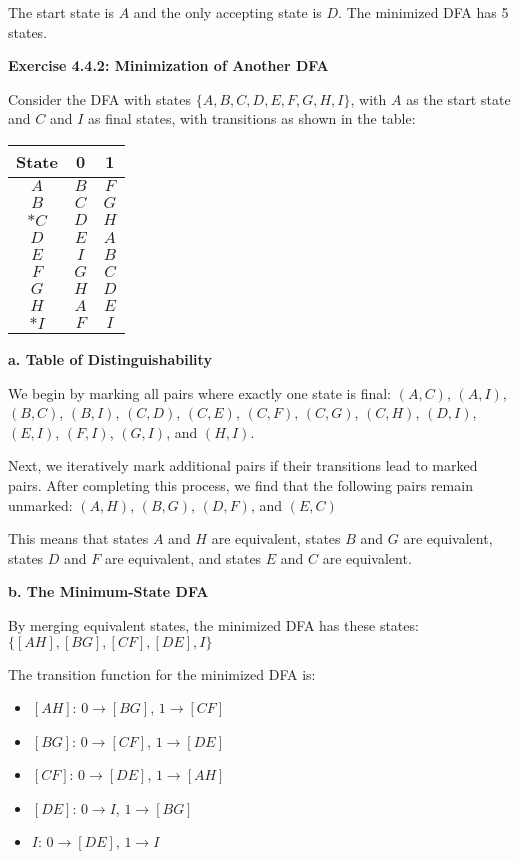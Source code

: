 \documentclass{article}
\theoremstyle{theorem}
\theoremstyle{definition}
\theoremstyle{remark}
\begin{document}
The start state is $A$ and the only accepting state is $D$. The minimized DFA has 5 states.

\textbf{Exercise 4.4.2: Minimization of Another DFA}

Consider the DFA with states $\{A, B, C, D, E, F, G, H, I\}$, with $A$ as the start state and $C$ and $I$ as final states, with transitions as shown in the table:

\begin{center}
\begin{tabular}{c|cc}
\textbf{State} & \textbf{0} & \textbf{1} \\ \hline
$A$ & $B$ & $F$ \\
$B$ & $C$ & $G$ \\
$*C$ & $D$ & $H$ \\
$D$ & $E$ & $A$ \\
$E$ & $I$ & $B$ \\
$F$ & $G$ & $C$ \\
$G$ & $H$ & $D$ \\
$H$ & $A$ & $E$ \\
$*I$ & $F$ & $I$ \\
\end{tabular}
\end{center}

\textbf{a. Table of Distinguishability}

We begin by marking all pairs where exactly one state is final: 
$(A,C)$, $(A,I)$, $(B,C)$, $(B,I)$, $(C,D)$, $(C,E)$, $(C,F)$, $(C,G)$, $(C,H)$, $(D,I)$, $(E,I)$, $(F,I)$, $(G,I)$, and $(H,I)$.

Next, we iteratively mark additional pairs if their transitions lead to marked pairs. After completing this process, we find that the following pairs remain unmarked:
$(A,H)$, $(B,G)$, $(D,F)$, and $(E,C)$

This means that states $A$ and $H$ are equivalent, states $B$ and $G$ are equivalent, states $D$ and $F$ are equivalent, and states $E$ and $C$ are equivalent.

\textbf{b. The Minimum-State DFA}

By merging equivalent states, the minimized DFA has these states:
$\{[AH], [BG], [CF], [DE], I\}$

The transition function for the minimized DFA is:
\begin{itemize}
    \item $[AH]$: $0 \to [BG]$, $1 \to [CF]$
    \item $[BG]$: $0 \to [CF]$, $1 \to [DE]$
    \item $[CF]$: $0 \to [DE]$, $1 \to [AH]$
    \item $[DE]$: $0 \to I$, $1 \to [BG]$
    \item $I$: $0 \to [DE]$, $1 \to I$
\end{itemize}
\end{document}
